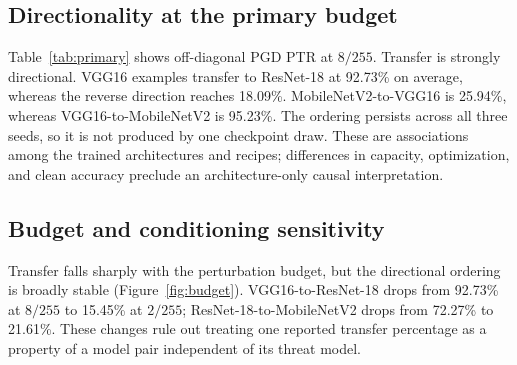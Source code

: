 \documentclass[10pt,twocolumn]{article}
\begin{document}
\begin{table}[t]
\centering
\caption{Mean source ASR (\%) over three seeds.}
\label{tab:asr}
\end{table}

\subsection{Directionality at the primary budget}
Table~\ref{tab:primary} shows off-diagonal PGD PTR at $8/255$. Transfer is strongly directional. VGG16 examples transfer to ResNet-18 at 92.73\% on average, whereas the reverse direction reaches 18.09\%. MobileNetV2-to-VGG16 is 25.94\%, whereas VGG16-to-MobileNetV2 is 95.23\%. The ordering persists across all three seeds, so it is not produced by one checkpoint draw. These are associations among the trained architectures and recipes; differences in capacity, optimization, and clean accuracy preclude an architecture-only causal interpretation.

\begin{table}[t]
\centering
\caption{PGD PTR (\%) at $8/255$, reported as mean [minimum, maximum] over three training seeds.}
\label{tab:primary}
\end{table}

\subsection{Budget and conditioning sensitivity}
Transfer falls sharply with the perturbation budget, but the directional ordering is broadly stable (Figure~\ref{fig:budget}). VGG16-to-ResNet-18 drops from 92.73\% at $8/255$ to 15.45\% at $2/255$; ResNet-18-to-MobileNetV2 drops from 72.27\% to 21.61\%. These changes rule out treating one reported transfer percentage as a property of a model pair independent of its threat model.
\end{document}
